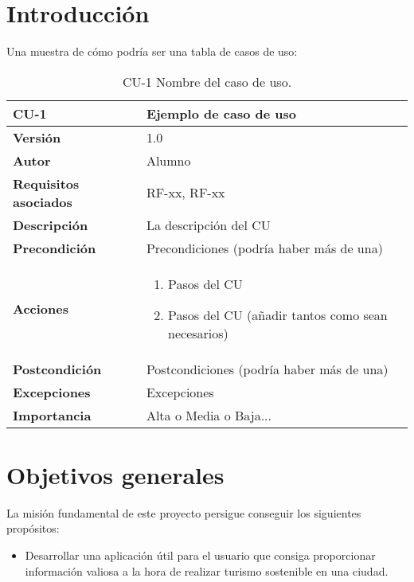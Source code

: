 
\section{Introducción}

Una muestra de cómo podría ser una tabla de casos de uso:

\begin{table}[p]
	\centering
	\begin{tabularx}{\linewidth}{ p{} p{} }
		\toprule
		\textbf{CU-1}    & \textbf{Ejemplo de caso de uso}\\
		\toprule
		\textbf{Versión}              & 1.0    \\
		\textbf{Autor}                & Alumno \\
		\textbf{Requisitos asociados} & RF-xx, RF-xx \\
		\textbf{Descripción}          & La descripción del CU \\
		\textbf{Precondición}         & Precondiciones (podría haber más de una) \\
		\textbf{Acciones}             &
		\begin{enumerate}
			\def\labelenumi{\arabic{enumi}.}
			\tightlist
			\item Pasos del CU
			\item Pasos del CU (añadir tantos como sean necesarios)
		\end{enumerate}\\
		\textbf{Postcondición}        & Postcondiciones (podría haber más de una) \\
		\textbf{Excepciones}          & Excepciones \\
		\textbf{Importancia}          & Alta o Media o Baja... \\
		\bottomrule
	\end{tabularx}
	\caption{CU-1 Nombre del caso de uso.}
\end{table}

\section{Objetivos generales}
La misión fundamental de este proyecto persigue conseguir los siguientes propósitos:
\begin{itemize}
	\item Desarrollar una aplicación útil para el usuario que consiga proporcionar información valiosa a la hora de realizar turismo sostenible en una ciudad.
	\
\end{itemize}
